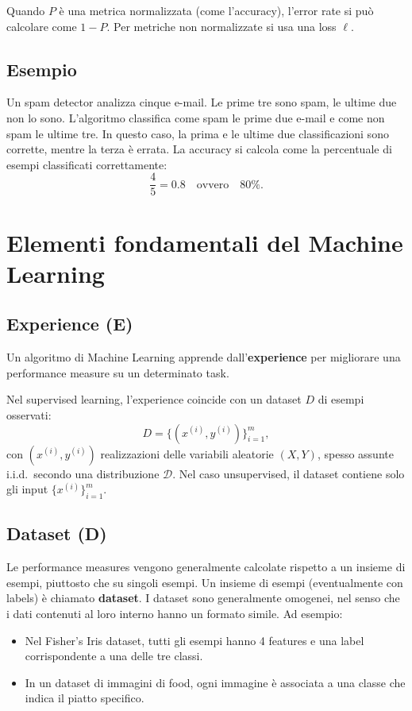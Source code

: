 \noindent
Quando $P$ \`e una metrica normalizzata (come l'accuracy), l'error rate si pu\`o calcolare come $1 - P$. Per metriche non normalizzate si usa una loss $\ell$.

\subsection{Esempio}

Un spam detector analizza cinque e-mail. Le prime tre sono spam, le ultime due non lo sono. L'algoritmo classifica come spam le prime due e-mail e come non spam le ultime tre. In questo caso, la prima e le ultime due classificazioni sono corrette, mentre la terza \`e errata. La accuracy si calcola come la percentuale di esempi classificati correttamente:
\[
\frac{4}{5} = 0.8 \quad \text{ovvero} \quad 80\%.
\]

\section{Elementi fondamentali del Machine Learning}

\subsection{Experience (E)}

Un algoritmo di Machine Learning apprende dall'\textbf{experience} per migliorare una performance measure su un determinato task.

\noindent
Nel supervised learning, l'experience coincide con un dataset $D$ di esempi osservati:
\[
D = \{(x^{(i)}, y^{(i)})\}_{i=1}^m,
\]
con $(x^{(i)}, y^{(i)})$ realizzazioni delle variabili aleatorie $(X,Y)$, spesso assunte i.i.d.\ secondo una distribuzione $\mathcal{D}$. Nel caso unsupervised, il dataset contiene solo gli input $\{x^{(i)}\}_{i=1}^m$.

\subsection{Dataset (D)}

Le performance measures vengono generalmente calcolate rispetto a un insieme di esempi, piuttosto che su singoli esempi. Un insieme di esempi (eventualmente con labels) \`e chiamato \textbf{dataset}. I dataset sono generalmente omogenei, nel senso che i dati contenuti al loro interno hanno un formato simile. Ad esempio:
\begin{itemize}
    \item Nel Fisher's Iris dataset, tutti gli esempi hanno 4 features e una label corrispondente a una delle tre classi.
    \item In un dataset di immagini di food, ogni immagine \`e associata a una classe che indica il piatto specifico.
\end{itemize}

